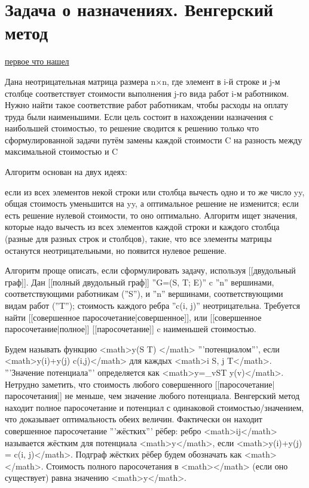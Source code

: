 \documentclass[discrete.tex]{subfiles}
\begin{document}
  \section{Задача о назначениях. Венгерский метод}

  \href{https://math.semestr.ru/nazn/venger.php}{первое что нашел}

  Дана неотрицательная матрица размера n×n, где элемент в i-й строке и j-м столбце соответствует стоимости выполнения j-го вида работ i-м работником. Нужно найти такое соответствие работ работникам, чтобы расходы на оплату труда были наименьшими. Если цель состоит в нахождении назначения с наибольшей стоимостью, то решение сводится к решению только что сформулированной задачи путём замены каждой стоимости C на разность между максимальной стоимостью и C

  Алгоритм основан на двух идеях:

  если из всех элементов некой строки или столбца вычесть одно и то же число {\displaystyle y}y, общая стоимость уменьшится на {\displaystyle y}y, а оптимальное решение не изменится;
  если есть решение нулевой стоимости, то оно оптимально.
  Алгоритм ищет значения, которые надо вычесть из всех элементов каждой строки и каждого столбца (разные для разных строк и столбцов), такие, что все элементы матрицы останутся неотрицательными, но появится нулевое решение.

  Алгоритм проще описать, если сформулировать задачу, используя [[двудольный граф]].
Дан [[полный двудольный граф]] ''G=(S, T; E)'' c ''n'' вершинами, соответствующими работникам (''S''), и ''n'' вершинами, соответствующими видам работ (''T''); стоимость каждого ребра ''c(i, j)'' неотрицательна.
Требуется найти [[совершенное паросочетание|совершенное]], или [[совершенное паросочетание|полное]] [[паросочетание]] c наименьшей стоимостью.

Будем называть функцию <math>y\colon (S \cup T) \to {}</math> '''потенциалом''', если <math>y(i)+y(j) \leq c(i,j)</math> для каждых <math>i \in S, j \in T</math>.
'''Значение потенциала''' определяется как <math>y=\sum_{v\in S\cup T} y(v)</math>.
Нетрудно заметить, что стоимость любого совершенного [[паросочетание|паросочетания]] не меньше, чем значение любого потенциала.
Венгерский метод находит полное паросочетание и потенциал с одинаковой стоимостью/значением, что доказывает оптимальность обеих величин.
Фактически он находит совершенное паросочетание '''жёстких''' рёбер: ребро <math>ij</math> называется жёстким для потенциала <math>y</math>, если <math>y(i)+y(j) = c(i, j)</math>.
Подграф жёстких рёбер будем обозначать как <math></math>.
Стоимость полного паросочетания в <math></math> (если оно существует) равна значению <math>y</math>.
\end{document}

